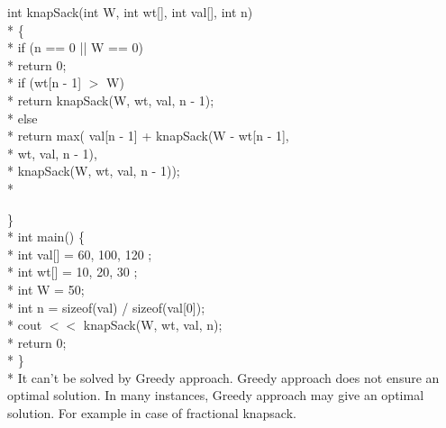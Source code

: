 \documentclass[12pt]{book}
\begin{document}
int knapSack(int W, int wt[], int val[], int n) \\*
\{ \\*
\phantom{x} \hspace{3ex}    if (n == 0 || W == 0) \\*
\phantom{x} \hspace{3ex} \phantom{x} \hspace{3ex}       return 0; \\*
\phantom{x} \hspace{3ex}    if (wt[n - 1] $>$ W) \\*
\phantom{x} \hspace{3ex} \phantom{x} \hspace{3ex}       return knapSack(W, wt, val, n - 1); \\*
\phantom{x} \hspace{3ex}    else\\*
\phantom{x} \hspace{3ex} \phantom{x} \hspace{3ex}       return max( 
            val[n - 1] 
                + knapSack(W - wt[n - 1], \\*
                        wt, val, n - 1), \\*
\phantom{x} \hspace{3ex}\phantom{x} \hspace{3ex}    knapSack(W, wt, val, n - 1)); \\*

\}\\*
\newline
int main() 
\{ \\* 
\phantom{x} \hspace{3ex}    int val[] = { 60, 100, 120 }; \\*
 \phantom{x} \hspace{3ex}   int wt[] = { 10, 20, 30 }; \\*
\phantom{x} \hspace{3ex}    int W = 50; \\*
\phantom{x} \hspace{3ex}    int n = sizeof(val) / sizeof(val[0]); \\*
\phantom{x} \hspace{3ex}    cout $<<$ knapSack(W, wt, val, n); \\*
\phantom{x} \hspace{3ex}    return 0; \\*
\} \\* 
\newline
\newline
It can’t be solved by Greedy approach. Greedy approach does not ensure an optimal solution. In many instances, Greedy approach may give an optimal solution. For example in case of fractional knapsack.\\
\newline
\end{document}
